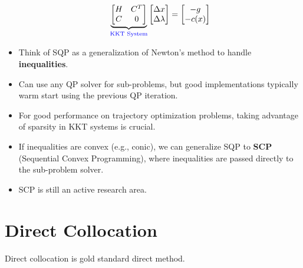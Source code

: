 \documentclass[11pt]{article}
\begin{document}
\begin{itemize}
    \begin{equation*}
        \underbrace{
        \begin{bmatrix}
            H & C^T \\
            C & 0
        \end{bmatrix}
        }_{\text{\textcolor{blue}{KKT System}}}
        \begin{bmatrix}
            \Delta x \\
            \Delta \lambda
        \end{bmatrix}
        =
        \begin{bmatrix}
            -g \\
            -c(x)
        \end{bmatrix}
    \end{equation*}
    \item Think of SQP as a generalization of Newton’s method to handle \textbf{inequalities}.
    \item Can use any QP solver for sub-problems, but good implementations typically warm start using the previous QP iteration.
    \item For good performance on trajectory optimization problems, taking advantage of sparsity in KKT systems is crucial.
    \item If inequalities are convex (e.g., conic), we can generalize SQP to \textbf{SCP} (Sequential Convex Programming), where inequalities are passed directly to the sub-problem solver.
    \item SCP is still an active research area.
\end{itemize}

\section*{Direct Collocation}

Direct collocation is gold standard direct method.
\end{document}
